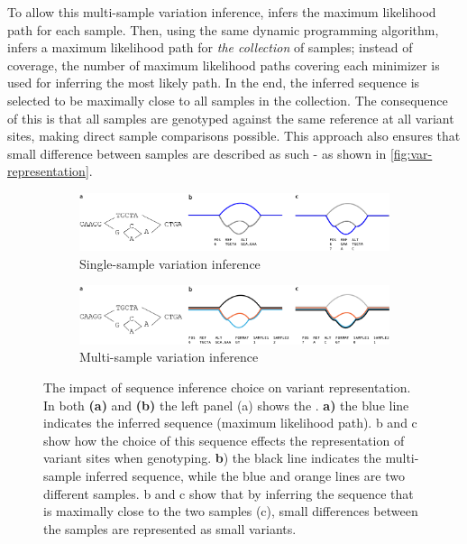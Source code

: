 To allow this multi-sample variation inference, \pandora{} infers the maximum likelihood path for each sample. Then, using the same dynamic programming algorithm, \pandora{} infers a maximum likelihood path for \emph{the collection} of samples; instead of \kmer{} coverage, the number of maximum likelihood paths covering each minimizer is used for inferring the most likely path. In the end, the inferred sequence is selected to be maximally close to all samples in the collection. The consequence of this is that all samples are genotyped against the same reference at all variant sites, making direct sample comparisons possible. This approach also ensures that small difference between samples are described as such - as shown in \autoref{fig:var-representation}.

\begin{figure}
     \centering
     \begin{subfigure}[b]{0.95\textwidth}
        \includegraphics[width=0.95\columnwidth]{Chapter0/Figs/map_variation_representation.png}
        \centering
        \caption{Single-sample variation inference}
        \label{fig:map-var-representation}
     \end{subfigure}
     \begin{subfigure}[b]{0.95\textwidth}
         \centering
        \includegraphics[width=0.95\columnwidth]{Chapter0/Figs/variant_representation.png}
         \caption{Multi-sample variation inference}
         \label{fig:var-representation}
     \end{subfigure}
     \caption{The impact of sequence inference choice on variant representation. In both \textbf{(a)} and \textbf{(b)} the left panel (a) shows the \prg{}. \textbf{a)} the blue line indicates the inferred sequence (maximum likelihood path). b and c show how the choice of this sequence effects the representation of variant sites when genotyping. \textbf{b}) the black line indicates the multi-sample inferred sequence, while the blue and orange lines are two different samples. b and c show that by inferring the sequence that is maximally close to the two samples (c), small differences between the samples are represented as small variants.}
     \label{fig:pandora-var-representation}
\end{figure}

